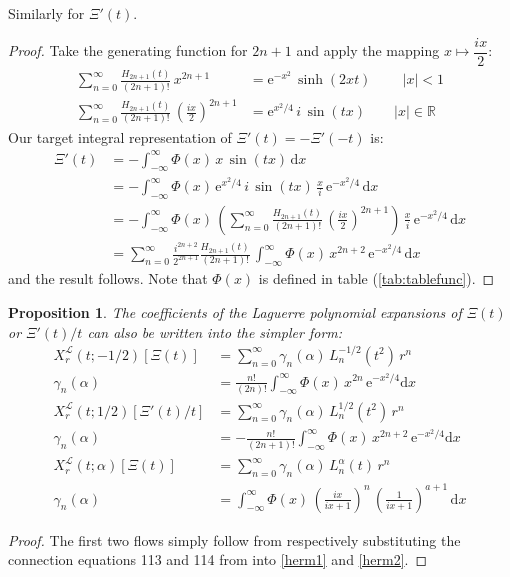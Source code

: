 \documentclass[a4paper,11pt,twoside]{amsart}
\newtheorem{proposition}[theorem]{Proposition}
\newcommand{\verifiedeq}{=}
\newcommand{\verifiedeq}{\stackrel{\checkmark}{=}}
\begin{document}
Similarly for $\Xi'(t)$. 
\begin{proof}
Take the generating function for $2n+1$ and apply the mapping $x \mapsto \dfrac{ix}{2}$:
\begin{align}
 \sum_{n=0}^\infty \frac{H_{2n+1}(t)}{(2n+1)!}\, x^{2n+1} &\verifiedeq \mathrm{e}^{-x^2}\,\sinh(2xt) \ \qquad |x| < 1 \\
 \sum_{n=0}^\infty \frac{H_{2n+1}(t)}{(2n+1)!}\,\left(\frac{ix}{2}\right)^{2n+1} &\verifiedeq  \mathrm{e}^{x^2/4}\,i\,\sin(tx)\qquad |x| \in \mathbb{R}
\end{align}
Our target integral representation of $\Xi'(t) = -\Xi'(-t)$ is:
\begin{align}
 \Xi'(t) &\verifiedeq -\int_{-\infty}^\infty \Phi(x)\,x\,\sin(tx)\, \mathrm{d}x \\
  & \verifiedeq -\int_{-\infty}^\infty \Phi(x)\,\mathrm{e}^{x^2/4}\,i\,\sin(tx)\,\frac{x}{i}\,\mathrm{e}^{-x^2/4}\,\mathrm{d}x \\
  & \verifiedeq -\int_{-\infty}^\infty \Phi(x)\,\left(\sum_{n=0}^\infty \frac{H_{2n+1}(t)}{(2n+1)!}\,\left(\frac{ix}{2}\right)^{2n+1} \right)\,\frac{x}{i}\,\mathrm{e}^{-x^2/4}\,\mathrm{d}x \\
  & \verifiedeq \sum_{n=0}^\infty \frac{i^{2n+2}}{2^{2n+1}}\frac{H_{2n+1}(t)}{(2n+1)!}\,\int_{-\infty}^\infty \Phi(x)\,x^{2n+2}\,\mathrm{e}^{-x^2/4}\,\mathrm{d}x
\end{align}
and the result follows. Note that $\Phi(x)$ is defined in table (\ref{tab:tablefunc}).
\end{proof}

\begin{proposition}
The coefficients of the Laguerre polynomial expansions of $\Xi(t)$ or $\Xi'(t)/t$ can also be written into the simpler form: 
\begin{align}
X^{\mathcal{L}}_r(t;-1/2)\left[\Xi(t)\right] &\verifiedeq \sum_{n=0}^\infty \gamma_n(\alpha)\,L^{-1/2}_n(t^2)\,r^n \\
\gamma_n(\alpha) &\verifiedeq \frac{n!}{(2n)!}\int_{-\infty}^{\infty} \Phi(x)\,x^{2n}\,\mathrm{e}^{-x^2/4}\mathrm{d}x \\
X^{\mathcal{L}}_r(t;1/2)\left[\Xi'(t)/t\right] &\verifiedeq \sum_{n=0}^\infty \gamma_n(\alpha)\,L^{1/2}_n(t^2)\,r^n \\
\gamma_n(\alpha) &\verifiedeq -\frac{n!}{(2n+1)!}\int_{-\infty}^{\infty} \Phi(x)\,x^{2n+2}\,\mathrm{e}^{-x^2/4}\mathrm{d}x \\
X^{\mathcal{L}}_r(t;\alpha)\left[\Xi(t)\right] &\verifiedeq \sum_{n=0}^\infty \gamma_n(\alpha)\,L^{\alpha}_n(t)\,r^n \\
\gamma_n(\alpha) &\verifiedeq \int_{-\infty}^{\infty} \Phi(x)\,\left(\frac{ix}{ix+1}\right)^n\,\left(\frac{1}{ix+1}\right)^{a+1}\,\mathrm{d}x
\end{align}
\end{proposition}
\begin{proof}
The first two flows simply follow from respectively substituting the connection equations 113 and 114 from \cite{koesup} into \ref{herm1} and \ref{herm2}.  
\end{proof}
\end{document}
